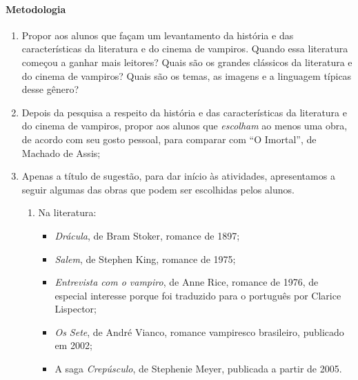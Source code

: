 \documentclass{extarticle}
\begin{document}
\paragraph{Metodologia}
\begin{enumerate}
\item Propor aos alunos que façam um levantamento da história e das
características da literatura e do cinema de vampiros. Quando essa
literatura começou a ganhar mais leitores? Quais são os grandes
clássicos da literatura e do cinema de vampiros? Quais são os temas, as
imagens e a linguagem típicas desse gênero?

\item Depois da pesquisa a respeito da história e das características da
literatura e do cinema de vampiros, propor aos alunos que
\emph{escolham} ao menos uma obra, de acordo com seu gosto pessoal, para
comparar com ``O Imortal'', de Machado de Assis;

\item Apenas a título de sugestão, para dar início às atividades,
apresentamos a seguir algumas das obras que podem ser escolhidas pelos
alunos.

\begin{enumerate}
\item Na literatura:

\begin{itemize}
\item \emph{Drácula}, de Bram Stoker, romance de 1897; 


\item \emph{Salem}, de Stephen King, romance de 1975; 

\item \emph{Entrevista com o vampiro}, de Anne Rice, romance de 1976, de especial interesse porque foi traduzido para o português por Clarice Lispector; 

\item \emph{Os Sete}, de André Vianco, romance vampiresco brasileiro, publicado em 2002; 

\item A saga \emph{Crepúsculo}, de Stephenie Meyer, publicada a partir de 2005.



\end{itemize}
\end{enumerate}
\end{enumerate}
\end{document}
